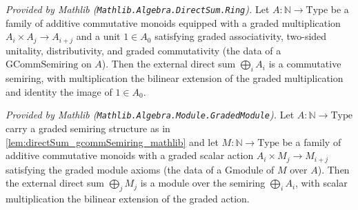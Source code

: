 \begin{lemma}
  \label{lem:directSum_gcommSemiring_mathlib}
  \mathlibok
  \textit{Provided by Mathlib (\texttt{Mathlib.Algebra.DirectSum.Ring}).}
  Let \(A : \mathbb{N} \to \mathrm{Type}\) be a family of additive commutative
  monoids equipped with a graded multiplication
  \(A_i \times A_j \to A_{i+j}\) and a unit \(1 \in A_0\) satisfying graded
  associativity, two-sided unitality, distributivity, and graded commutativity
  (the data of a \(\mathrm{GCommSemiring}\) on \(A\)). Then the external direct
  sum \(\bigoplus_i A_i\) is a commutative semiring, with multiplication the
  bilinear extension of the graded multiplication and identity the image of
  \(1 \in A_0\).
\end{lemma}

\begin{lemma}
  \label{lem:directSum_gmodule_mathlib}
  \mathlibok
  \textit{Provided by Mathlib (\texttt{Mathlib.Algebra.Module.GradedModule}).}
  Let \(A : \mathbb{N} \to \mathrm{Type}\) carry a graded semiring structure as
  in \cref{lem:directSum_gcommSemiring_mathlib} and let
  \(M : \mathbb{N} \to \mathrm{Type}\) be a family of additive commutative
  monoids with a graded scalar action \(A_i \times M_j \to M_{i+j}\) satisfying
  the graded module axioms (the data of a \(\mathrm{Gmodule}\) of \(M\) over
  \(A\)). Then the external direct sum \(\bigoplus_j M_j\) is a module over the
  semiring \(\bigoplus_i A_i\), with scalar multiplication the bilinear
  extension of the graded action.
\end{lemma}

